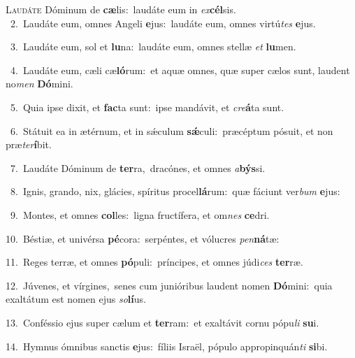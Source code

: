 \lettrine{\initial\textcolor{\initialcolor}{L}}{audáte} Dóminum de \textbf{cæ}\-lis:~\star laudáte eum in \textit{ex}\-\textbf{cél}sis.\\
{\numbfont\textcolor{\numbcolor}{~2.}}~Laudáte eum, omnes Angeli \textbf{e}\-jus:~\star laudáte eum, omnes virtú\textit{tes} \textbf{e}\-jus.\par
{\numbfont\textcolor{\numbcolor}{~3.}}~Laudáte eum, sol et \textbf{lu}\-na:~\star laudáte eum, omnes stellæ \textit{et} \textbf{lu}\-men.\par
{\numbfont\textcolor{\numbcolor}{~4.}}~Laudáte eum, cæli cæ\-\textbf{ló}\-rum:~\star et aquæ omnes, quæ super cælos sunt, laudent no\textit{men} \textbf{Dó}\-mini.\par
{\numbfont\textcolor{\numbcolor}{~5.}}~Quia ipse dixit, et \textbf{fac}\-ta sunt:~\star ipse mandávit, et \textit{cre}\-\textbf{á}ta sunt.\par
{\numbfont\textcolor{\numbcolor}{~6.}}~Státuit ea in ætérnum, et in sǽculum \textbf{sǽ}\-culi:~\star præcéptum pósuit, et non præ\-\textit{ter}\-\textbf{í}bit.\par
{\numbfont\textcolor{\numbcolor}{~7.}}~Laudáte Dóminum de \textbf{ter}\-ra,~\star dracónes, et omnes \textit{a}\-\textbf{býs}si.\par
{\numbfont\textcolor{\numbcolor}{~8.}}~Ignis, grando, nix, glácies, spíritus procel\-\textbf{lá}\-rum:~\star quæ fáciunt ver\textit{bum} \textbf{e}\-jus:\par
{\numbfont\textcolor{\numbcolor}{~9.}}~Montes, et omnes \textbf{col}\-les:~\star ligna fructífera, et om\textit{nes} \textbf{ce}\-dri.\par
{\numbfont\textcolor{\numbcolor}{10.}}~Béstiæ, et univérsa \textbf{pé}\-cora:~\star serpéntes, et vólucres \textit{pen}\-\textbf{ná}tæ:\par
{\numbfont\textcolor{\numbcolor}{11.}}~Reges terræ, et omnes \textbf{pó}\-puli:~\star príncipes, et omnes júdi\textit{ces} \textbf{ter}\-ræ.\par
{\numbfont\textcolor{\numbcolor}{12.}}~Júvenes, et vírgines,~\dagger senes cum junióribus laudent nomen \textbf{Dó}\-mini:~\star quia exaltátum est nomen ejus \textit{so}\-\textbf{lí}us.\par
{\numbfont\textcolor{\numbcolor}{13.}}~Conféssio ejus super cælum et \textbf{ter}\-ram:~\star et exaltávit cornu pópu\textit{li} \textbf{su}\-i.\par
{\numbfont\textcolor{\numbcolor}{14.}}~Hymnus ómnibus sanctis \textbf{e}\-jus:~\star fíliis Israël, pópulo appropinquán\textit{ti} \textbf{si}\-bi.\par
